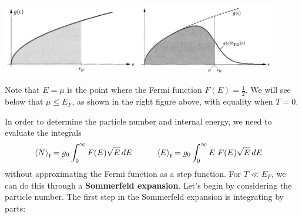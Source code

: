 \noindent\includegraphics[width=0.45\textwidth]{figs/unit08_zero.pdf}\hfill \includegraphics[width=0.45\textwidth]{figs/unit08_nonzero.pdf}

Note that $E = \mu$ is the point where the Fermi function $F(E) = \frac{1}{2}$.
We will see below that $\mu \leq E_F$, as shown in the right figure above, with equality when $T = 0$.

In order to determine the particle number and internal energy, we need to evaluate the integrals
\begin{align}
  \label{eq:DoS_full}
  \left\langle N \right\rangle_{\text{f}} & = g_0 \int_0^{\infty} F(E) \sqrt{E} \mathop{dE} \qquad &
  \left\langle E \right\rangle_{\text{f}} & = g_0 \int_0^{\infty} E \; F(E) \sqrt{E} \mathop{dE}
\end{align}
without approximating the Fermi function as a step function.
For $T \ll E_F$, we can do this through a \textbf{Sommerfeld expansion}.
Let's begin by considering the particle number.
The first step in the Sommerfeld expansion is integrating by parts:
\begin{mdframed}
  \ \\[120 pt]
\end{mdframed}

